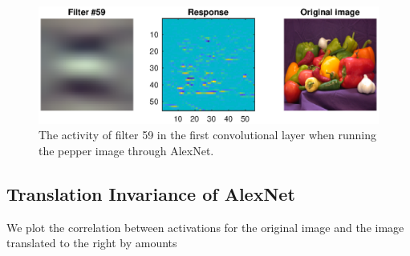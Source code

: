 \documentclass[11pt, oneside]{article}
\begin{document}
\begin{figure}[ht!]
\includegraphics[width=1\textwidth]{filter59.eps}
\caption{The activity of filter 59 in the first convolutional layer when running the pepper image through AlexNet.}
\label{fig:f59}
\end{figure}

\subsection{Translation Invariance of AlexNet}

We plot the correlation between activations for the original image and the image translated to the right by amounts 
\end{document}

